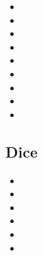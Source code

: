 \begin{itemize}
	\item \controllerR \hspace{1pt} \texttt{\controllerR}
	\item \controllerRalt \hspace{1pt} \texttt{\controllerRalt}
	\item \controllerZ \hspace{1pt} \texttt{\controllerZ}
	\item \controllerMouse \texttt{\controllerMouse}
	\item \controllerMouseLMB \texttt{\controllerMouseLMB}
	\item \controllerMouseRMB \texttt{\controllerMouseRMB}
	\item \controllerMouseScroll \texttt{\controllerMouseScroll}
	\item \controllerMouseScrollUp \texttt{\controllerMouseScrollUp}
	\item \controllerMouseScrollDown \texttt{\controllerMouseScrollDown}
\end{itemize}

\subsection{Dice}

\begin{itemize}
	\item \diceOne \hspace{1pt} \texttt{\diceOne}
	\item \diceTwo \hspace{1pt} \texttt{\diceTwo}
	\item \diceThree \hspace{1pt} \texttt{\diceThree}
	\item \diceFour \hspace{1pt} \texttt{\diceFour}
	\item \diceFive \hspace{1pt} \texttt{\diceFive}
	\item \diceSix \hspace{1pt} \texttt{\diceSix}
\end{itemize}

\newpage
